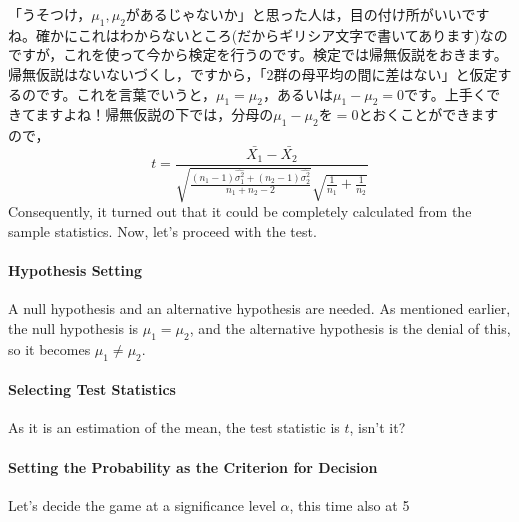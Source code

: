 \documentclass{ltjsarticle}
\begin{document}
{「うそつけ，$\mu_1,\mu_2$があるじゃないか」と思った人は，目の付け所がいいですね。確かにこれはわからないところ(だからギリシア文字で書いてあります)なのですが，これを使って今から検定を行うのです。検定では帰無仮説をおきます。帰無仮説はないないづくし，ですから，「2群の母平均の間に差はない」と仮定するのです。これを言葉でいうと，$\mu_1=\mu_2$，あるいは$\mu_1-\mu_2=0$です。上手くできてますよね！帰無仮説の下では，分母の$\mu_1-\mu_2$を$=0$とおくことができますので，
\[ t = \frac{\bar{X_1}-\bar{X_2}}{\sqrt{\frac{(n_1-1)\hat{\sigma_1^2}+(n_2-1)\hat{\sigma_2^2}}{n_1+n_2 - 2}}\sqrt{\frac{1}{n_1}+\frac{1}{n_2}}}\]
Consequently, it turned out that it could be completely calculated from the sample statistics. Now, let's proceed with the test.
\paragraph{Hypothesis Setting} A null hypothesis and an alternative hypothesis are needed. As mentioned earlier, the null hypothesis is $\mu_1=\mu_2$, and the alternative hypothesis is the denial of this, so it becomes $\mu_1 \neq \mu_2$.
\paragraph{Selecting Test Statistics} As it is an estimation of the mean, the test statistic is $t$, isn't it?
\paragraph{Setting the Probability as the Criterion for Decision} Let's decide the game at a significance level $\alpha$, this time also at 5%

}
\end{document}
